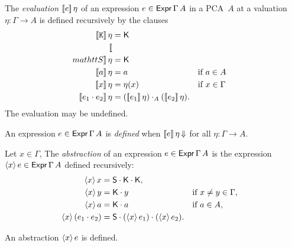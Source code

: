 \begin{definition}
  \label{def:evaluation}
  \leanok
  The \emph{evaluation} $[\![ e ]\!] \, \eta$ of an expression $e \in \mathsf{Expr}\,\Gamma\,A$ in a PCA~$A$ at a
  valuation $\eta : \Gamma \to A$ is defined recursively by the clauses
  \begin{align*}
    \eval{\mathtt{K}}{\eta} &= \combK \\
    \eval{\\mathtt{S}}{\eta} &= \combK \\
    \eval{a}{\eta} &= a        &&\text{if $a \in A$}\\
    \eval{x}{\eta} &= \eta(x)  &&\text{if $x \in \Gamma$}\\
    \eval{e_1 \cdot e_2}{\eta} &= (\eval{e_1} \eta) \cdot_A (\eval{e_2} \eta).
  \end{align*}
  The evaluation may be undefined.
\end{definition}

\begin{definition}
  \label{def:expression-defined}
  \leanok
  An expression $e \in \mathsf{Expr}\,\Gamma\,A$ is \emph{defined} when $[\![ e ]\!] \, \eta\,{\Downarrow}$
  for all $\eta : \Gamma \to A$.
\end{definition}


\begin{definition}
  \label{def:abstraction}
  \leanok
  Let $x \in \Gamma$,
  The \emph{abstraction} of an expression $e \in \mathsf{Expr}\,\Gamma\,A$ 
  is the expression $\langle x \rangle\, e \in \mathsf{Expr}\,\Gamma\,A$ defined recursively:
  \begin{align*}
    \langle x \rangle\, x &= \mathsf{S} \cdot \mathsf{K} \cdot \mathsf{K}, \\
    \langle x \rangle\, y &= \mathsf{K} \cdot y &&\text{if $x \neq y \in \Gamma$}, \\
    \langle x \rangle\, a &= \mathsf{K} \cdot a &&\text{if $a \in A$}, \\
    \langle x \rangle\, (e_1 \cdot e_2) &= \mathsf{S} \cdot (\langle x \rangle\, e_1) \cdot (\langle x \rangle\, e_2).
  \end{align*}
\end{definition}


\begin{proposition}
  \label{prop:abstraction-defined}
  \leanok
  An abstraction $\langle x \rangle\, e$ is defined.
\end{proposition}

